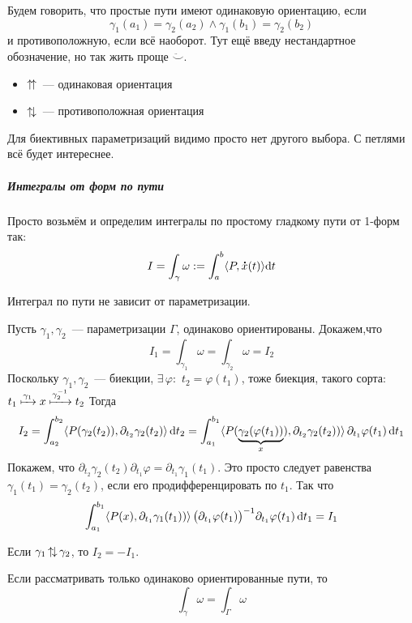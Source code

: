 \documentclass[12pt,timbord]{../../../notes}
\begin{document}
\begin{defn}\label{defn:lineint::defs::pathorient}
  Будем говорить, что простые пути имеют одинаковую ориентацию, если
  \[
    \gamma_1(a_1)=\gamma_2(a_2)\land \gamma_1(b_1) = \gamma_2(b_2)
  \]
  и противоположную, если всё наоборот.
  Тут ещё введу нестандартное обозначение, но так жить проще $\ddot\smile$.
  \begin{itemize}
    \item $\mathop{\uparrow\!\uparrow}$~--- одинаковая ориентация
    \item $\mathop{\uparrow\!\downarrow}$~--- противоположная ориентация
  \end{itemize}
\end{defn}
\begin{rem*}
  Для биективных параметризаций видимо просто нет другого выбора. С петлями всё будет интереснее.
\end{rem*}

\subparagraph{Интегралы от форм по пути}

\begin{defn}\label{defn:lineint::defs::lineint}
  Просто возьмём и определим интегралы по простому гладкому пути от 1-форм так:
  \[
    I = \int_\gamma \omega := \int_a^b \langle P,\accentset{\mbox{\bfseries .}}{x}(t)\rangle \mathrm{d} t
  \]
\end{defn}

\begin{prop}\label{prop:lineint::defs::lineint}
  Интеграл по пути не зависит от параметризации.
\end{prop}
\begin{ittproof}
  Пусть $\gamma_1, \gamma_2$~--- параметризации $\Gamma$, одинаково ориентированы. Докажем,что
  \[
    I_1 = \int_{\gamma_1} \omega = \int_{\gamma_2} \omega = I_2 
  \]
  Поскольку $\gamma_1, \gamma_2$~--- биекции, $\exists\, \varphi \colon $
  $t_2 = \varphi(t_1)$, тоже биекция, такого сорта:
   $t_1\xmapsto{\gamma_1}x\xmapsto{\gamma_2^{-1}}t_2$
  Тогда 
  \[
    I_2  = \int_{a_2}^{b_2} \langle P(\gamma_2(t_2)), \partial_{t_2}\gamma_2(t_2)\rangle \,\mathrm{d} t_2 = 
    \int_{a_1}^{b_1} \langle P(\underbrace{\gamma_2(\varphi(t_1))}_x), 
  \partial_{t_2}\gamma_2(t_2))\rangle \, \partial_{t_1}\varphi(t_1) \,\mathrm{d} t_1
  \]
  Покажем, что $\partial_{t_2}\gamma_2(t_2) \partial_{t_1}\varphi = \partial_{t_1}
  \gamma_1(t_1)$. Это просто следует равенства $\gamma_1(t_1)=\gamma_2(t_2)$, если его
  продифференцировать по $t_1$. Так что
  \[
    \int_{a_1}^{b_1} \langle P(x), 
  \partial_{t_1}\gamma_1(t_1))\rangle \, \bigl(\partial_{t_1}\varphi(t_1) \bigr)^{-1}
  \partial_{t_1}\varphi(t_1) \,\mathrm{d} t_1   = I_1
  \]
\end{ittproof}
\begin{rem}
  Если $\gamma_1 \mathop{\uparrow\!\downarrow} \gamma_2$, то $I_2 = - I_1$.
\end{rem}
\begin{rem}
  Если рассматривать только одинаково ориентированные пути, то
  \[
    \int_{\gamma} \omega = \int_{\Gamma} \omega
  \]
\end{rem}
\end{document}
